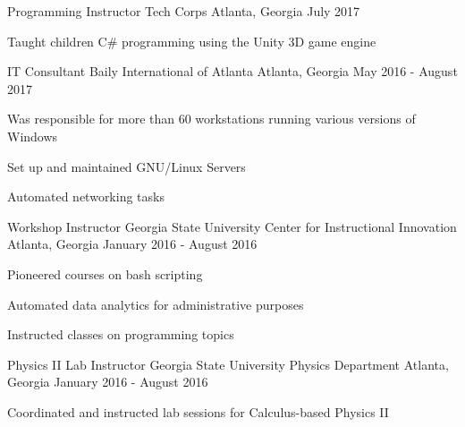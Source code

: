 \begin{cventries}

\cventry
{Programming Instructor} %
{Tech Corps} %
{Atlanta, Georgia} %
{July 2017} %
{ %
\begin{cvitems}
\item {Taught children C\# programming using the Unity 3D game engine}
\end{cvitems}
}


\cventry
{IT Consultant} %
{Baily International of Atlanta} %
{Atlanta, Georgia} %
{May 2016 - August 2017} %
{ %
\begin{cvitems}
\item {Was responsible for more than 60 workstations running various versions of Windows}
\item {Set up and maintained GNU/Linux Servers}
\item {Automated networking tasks}
\end{cvitems}
}


\cventry
{Workshop Instructor} %
{Georgia State University Center for Instructional Innovation} %
{Atlanta, Georgia} %
{January 2016 - August 2016} %
{ %
\begin{cvitems}
\item {Pioneered courses on bash scripting}
\item {Automated data analytics for administrative purposes}
\item {Instructed classes on programming topics}
\end{cvitems}
}


\cventry
{Physics II Lab Instructor} %
{Georgia State University Physics Department} %
{Atlanta, Georgia} %
{January 2016 - August 2016} %
{ %
\begin{cvitems}
\item {Coordinated and instructed lab sessions for Calculus-based Physics II}
\end{cvitems}
}



\end{cventries}
